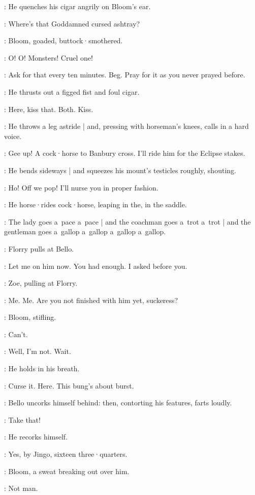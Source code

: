 :
He quenches his cigar angrily on Bloom's ear.

\Bello:
Where's that Goddamned cursed ashtray?

:
Bloom,
goaded,
buttock·smothered.

\Bloom:
O!
O!
Monsters!
Cruel one!

\Bello:
Ask for that every ten minutes.
Beg.
Pray for it as you never prayed before.

:
He thrusts out a figged fist and foul cigar.

\Bello:
Here,
kiss that.
Both.
Kiss.

:
He throws a leg astride |
and,
pressing with horseman's knees,
calls in a hard voice.

\Bello:
Gee up!
A cock·horse to Banbury cross.
I'll ride him for the Eclipse stakes.

:
He bends sideways |
and squeezes his mount's testicles roughly,
shouting.

\Bello:
Ho!
Off we pop!
I'll nurse you in proper fashion.

:
He horse·rides cock·horse,
leaping in the,
in the saddle.

\Bello:
The lady goes a~pace a~pace |
and the coachman goes a~trot a~trot |
and the gentleman goes a~gallop a~gallop a~gallop a~gallop.

:
Florry pulls at Bello.

\Florry:
Let me on him now.
You had enough.
I asked before you.

:
Zoe,
pulling at Florry.

\Zoe:
Me.
Me.
Are you not finished with him yet,
suckeress?

:
Bloom,
stifling.

\Bloom:
Can't.

\Bello:
Well,
I'm not.
Wait.

:
He holds in his breath.

\Bello:
Curse it.
Here.
This bung's about burst.

:
Bello uncorks himself behind:
then,
contorting his features,
farts loudly.


\Bello:
Take that!

:
He recorks himself.

\Bello:
Yes,
by Jingo,
sixteen three·quarters.%

:
Bloom,
a sweat breaking out over him.

\Bloom:
Not man.

